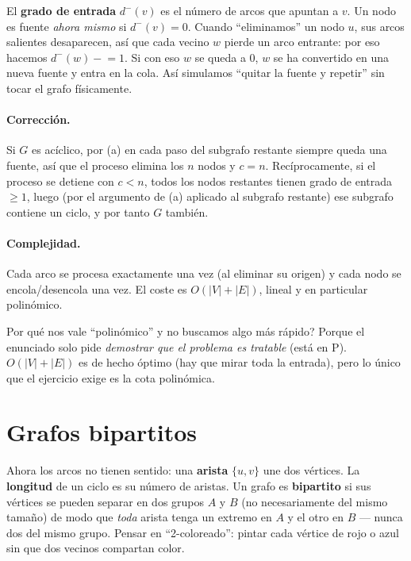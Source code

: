\documentclass[11pt,a4paper]{article}
\theoremstyle{plain}
\theoremstyle{definition}
\newcommand{\Pclass}{\mathrm{P}}
\begin{document}
\begin{concepto}
El \textbf{grado de entrada} $d^{-}(v)$ es el n\'umero de arcos que apuntan a $v$. Un
nodo es fuente \emph{ahora mismo} si $d^{-}(v)=0$. Cuando ``eliminamos'' un nodo $u$,
sus arcos salientes desaparecen, as\'i que cada vecino $w$ pierde un arco entrante:
por eso hacemos $d^{-}(w)\!\mathrel{-}\!=\!1$. Si con eso $w$ se queda a $0$, $w$ se
ha convertido en una nueva fuente y entra en la cola. As\'i simulamos ``quitar la
fuente y repetir'' sin tocar el grafo f\'isicamente.
\end{concepto}

\paragraph{Correcci\'on.} Si $G$ es ac\'iclico, por (a) en cada paso del subgrafo
restante siempre queda una fuente, as\'i que el proceso elimina los $n$ nodos y
$c=n$. Rec\'iprocamente, si el proceso se detiene con $c<n$, todos los nodos
restantes tienen grado de entrada $\geq 1$, luego (por el argumento de (a) aplicado
al subgrafo restante) ese subgrafo contiene un ciclo, y por tanto $G$ tambi\'en.

\paragraph{Complejidad.} Cada arco se procesa exactamente una vez (al eliminar su
origen) y cada nodo se encola/desencola una vez. El coste es $O(|V|+|E|)$, lineal y
en particular polin\'omico.

\begin{porque}
\textquestiondown{}Por qu\'e nos vale ``polin\'omico'' y no buscamos algo m\'as r\'apido? Porque el
enunciado solo pide \emph{demostrar que el problema es tratable} (est\'a en
$\Pclass$). $O(|V|+|E|)$ es de hecho \'optimo (hay que mirar toda la entrada), pero
lo \'unico que el ejercicio exige es la cota polin\'omica.
\end{porque}

\section{Grafos bipartitos}

\begin{concepto}
Ahora los arcos no tienen sentido: una \textbf{arista} $\{u,v\}$ une dos v\'ertices.
La \textbf{longitud} de un ciclo es su n\'umero de aristas. Un grafo es
\textbf{bipartito} si sus v\'ertices se pueden separar en dos grupos $A$ y $B$
(no necesariamente del mismo tama\~no) de modo que \emph{toda} arista tenga un
extremo en $A$ y el otro en $B$ --- nunca dos del mismo grupo. Pensar en
``2-coloreado'': pintar cada v\'ertice de rojo o azul sin que dos vecinos compartan
color.
\end{concepto}
\end{document}
